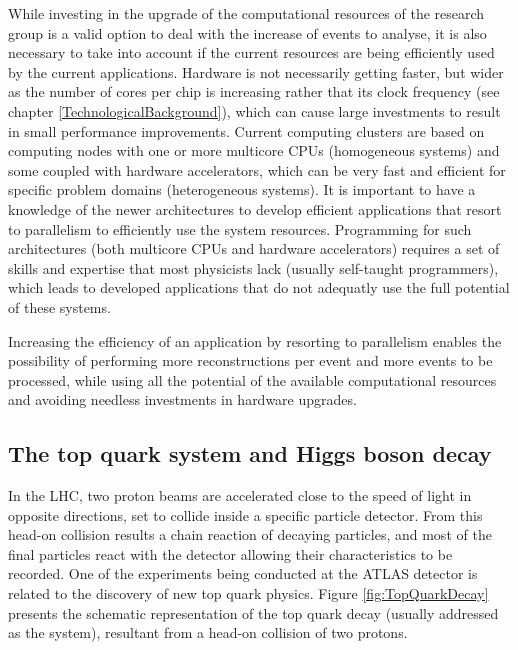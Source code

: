 While investing in the upgrade of the computational resources of the research group is a valid option to deal with the increase of events to analyse, it is also necessary to take into account if the current resources are being efficiently used by the current applications. Hardware is not necessarily getting faster, but wider as the number of cores per chip is increasing rather that its clock frequency (see chapter \ref{TechnologicalBackground}), which can cause large investments to result in small performance improvements. Current computing clusters are based on computing nodes with one or more multicore CPUs (homogeneous systems) and some coupled with hardware accelerators, which can be very fast and efficient for specific problem domains (heterogeneous systems). It is important to have a knowledge of the newer architectures to develop efficient applications that resort to parallelism to efficiently use the system resources. Programming for such architectures (both multicore CPUs and hardware accelerators) requires a set of skills and expertise that most physicists lack (usually self-taught programmers), which leads to developed applications that do not adequatly use the full potential of these systems.

Increasing the efficiency of an application by resorting to parallelism enables the possibility of performing more reconstructions per event and more events to be processed, while using all the potential of the available computational resources and avoiding needless investments in hardware upgrades.

\subsection{The top quark system and Higgs boson decay}
\label{TopQuarkSystem}

In the LHC, two proton beams are accelerated close to the speed of light in opposite directions, set to collide inside a specific particle detector. From this head-on collision results a chain reaction of decaying particles, and most of the final particles react with the detector allowing their characteristics to be recorded. One of the experiments being conducted at the ATLAS detector is related to the discovery of new top quark physics. Figure \ref{fig:TopQuarkDecay} presents the schematic representation of the top quark decay (usually addressed as the \ttbar system), resultant from a head-on collision of two protons.

